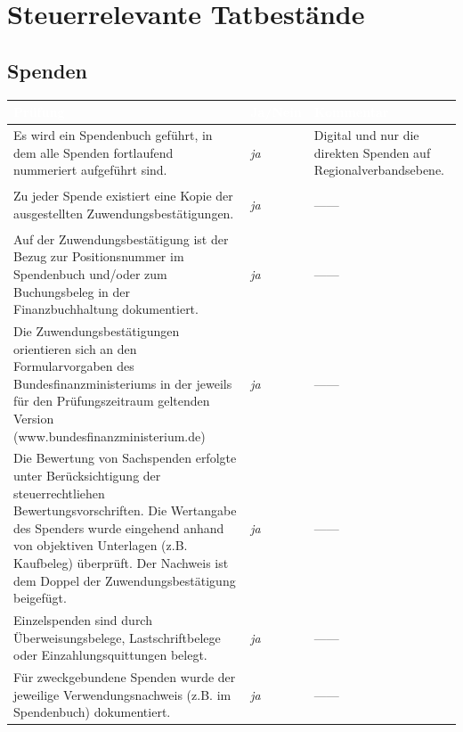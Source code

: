 \documentclass[%
	titlepage,oneside,12pt,headlines=1.5,numbers=noenddot, chapterprefix=false,parskip=full-,DIV=14,pagesize]{scrreprt}
\newcommand*{\ditto}{\begin{center}\vspace{-0.40in}---\quad \textquotedbl\quad ---\vspace{-0.24in}\end{center}}
\begin{document}
\chapter{Steuerrelevante Tatbestände}
\section{Spenden}
\begin{longtable}[ht]{|p{} p{} p{}|}
\hline\rowcolor{pirateorange} 
	\footnotesize\textcolor{white}{\textbf{Prüfung}} & \footnotesize\textcolor{white}{\textbf{Ja/Nein}} & \footnotesize\textcolor{white}{\textbf{Kommentar}}\\\endhead
        \scriptsize Es wird ein Spendenbuch  geführt, in dem alle Spenden fortlaufend nummeriert aufgeführt sind. & \scriptsize \textit{ja}  & \scriptsize Digital und nur die direkten Spenden auf Regionalverbandsebene.\\ 
        \scriptsize Zu jeder Spende existiert eine Kopie der ausgestellten  Zuwendungsbestätigungen. & \scriptsize \textit{ja}	& \scriptsize \ditto  \\
        \scriptsize Auf der Zuwendungsbestätigung ist der Bezug zur Positionsnummer im Spendenbuch und/oder zum Buchungsbeleg in der Finanzbuchhaltung dokumentiert. & \scriptsize \textit{ja} & \scriptsize \ditto  \\
       	\scriptsize Die Zuwendungsbestätigungen orientieren sich an den Formularvorgaben des Bundesfinanzministeriums in der jeweils für den Prüfungszeitraum geltenden Version (www.bundesfinanzministerium.de) & \scriptsize \textit{ja} & \scriptsize \ditto  \\
       	\scriptsize Die Bewertung von Sachspenden  erfolgte unter Berücksichtigung der steuerrechtliehen Bewertungsvorschriften. Die Wertangabe des Spenders wurde eingehend  anhand von objektiven Unterlagen (z.B. Kaufbeleg) überprüft. Der Nachweis ist dem Doppel der Zuwendungsbestätigung beigefügt. & \scriptsize \textit{ja} & \scriptsize \ditto \\
       	\scriptsize Einzelspenden  sind durch Überweisungsbelege, Lastschriftbelege oder Einzahlungsquittungen belegt. & \scriptsize \textit{ja} & \scriptsize \ditto \\
        \scriptsize Für zweckgebundene Spenden wurde der jeweilige Verwendungsnachweis (z.B. im Spendenbuch) dokumentiert. & \scriptsize \textit{ja}  	& \scriptsize \ditto \\
\hline
\end{longtable}
\end{document}
